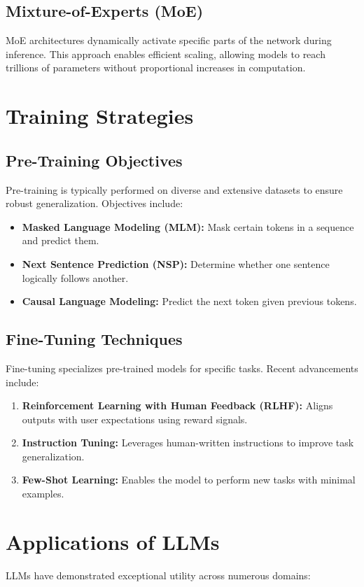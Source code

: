 \subsection{Mixture-of-Experts (MoE)}
MoE architectures dynamically activate specific parts of the network during inference. This approach enables efficient scaling, allowing models to reach trillions of parameters without proportional increases in computation.

\section{Training Strategies}
\subsection{Pre-Training Objectives}
Pre-training is typically performed on diverse and extensive datasets to ensure robust generalization. Objectives include:
\begin{itemize}
    \item \textbf{Masked Language Modeling (MLM):} Mask certain tokens in a sequence and predict them.
    \item \textbf{Next Sentence Prediction (NSP):} Determine whether one sentence logically follows another.
    \item \textbf{Causal Language Modeling:} Predict the next token given previous tokens.
\end{itemize}

\subsection{Fine-Tuning Techniques}
Fine-tuning specializes pre-trained models for specific tasks. Recent advancements include:
\begin{enumerate}
    \item \textbf{Reinforcement Learning with Human Feedback (RLHF):} Aligns outputs with user expectations using reward signals.
    \item \textbf{Instruction Tuning:} Leverages human-written instructions to improve task generalization.
    \item \textbf{Few-Shot Learning:} Enables the model to perform new tasks with minimal examples.
\end{enumerate}

\section{Applications of LLMs}
LLMs have demonstrated exceptional utility across numerous domains:
